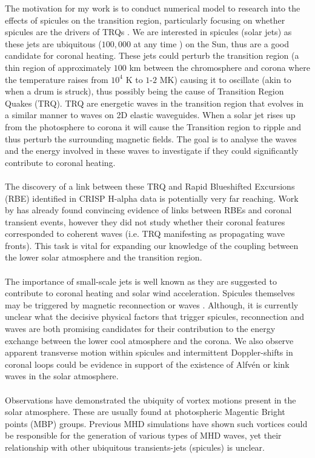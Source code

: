 \documentclass[12pt]{ociamthesis}
\newcommand{\Alfven}{Alfv\'{e}n }
\begin{document}
The motivation for my work is to conduct numerical model to research into the effects of spicules on the transition region, particularly focusing on whether spicules are the drivers of TRQs \citep{Scullion2011}. We are interested in spicules (solar jets) as these jets are ubiquitous ($100,000$  at  any  time \citep{Beckers1968}) on the Sun, thus are a good candidate for coronal heating. These jets could perturb the transition region (a thin region of approximately $100$ km between the chromosphere and corona where the temperature raises from $10^4$ K to $1$-$2$ MK) causing it to oscillate (akin to when a drum is struck), thus possibly being the cause of Transition Region Quakes (TRQ). TRQ are energetic waves in the transition region that evolves in a similar manner to waves on 2D elastic waveguides. When a solar jet rises up from the photosphere to corona it will cause the Transition region to ripple and thus perturb the surrounding magnetic fields. The goal is to analyse the waves and the energy involved in these waves to investigate if they could significantly contribute to coronal heating. \\ \\ The discovery of a link between these TRQ and Rapid Blueshifted Excursions (RBE) identified in CRISP H-alpha data is potentially very far reaching. Work by \cite{Henriques2016} has already found convincing evidence of links between RBEs and coronal transient events, however they did not study whether their coronal features corresponded to coherent waves (i.e. TRQ manifesting as propagating wave fronts). This task is vital for expanding our knowledge of the coupling between the lower solar atmosphere and the transition region. \\ \\ The importance of small-scale jets is well known as they are suggested to contribute to coronal heating and solar wind acceleration. Spicules themselves may be triggered by magnetic reconnection \citep{Pontieu2007PASJ} or waves \citep{Pontieu2004Natur}. Although, it is currently unclear what the decisive physical factors that trigger spicules, reconnection and waves are both promising candidates for their contribution to the energy exchange between the lower cool atmosphere and the corona. We also observe apparent transverse motion within spicules and intermittent Doppler-shifts in coronal loops could be evidence in support of the existence of \Alfven or kink waves in the solar atmosphere.  \\ \\
Observations have demonstrated the ubiquity of vortex motions present in the solar atmosphere. These are usually found at photospheric Magentic Bright points (MBP) groups. Previous MHD simulations have shown such vortices could be responsible for the generation of various types of MHD waves, yet their relationship with other ubiquitous transients-jets (spicules) is unclear.
\end{document}
